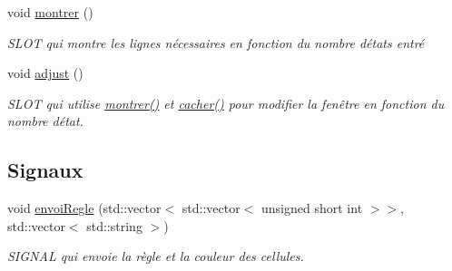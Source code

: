 \begin{DoxyCompactItemize}
void \hyperlink{class_regle2_d_a95a59bb0ffbc2a4fd735a4695c95d72f}{montrer} ()
\begin{DoxyCompactList}\small\item\em S\+L\+OT qui montre les lignes nécessaires en fonction du nombre d\textquotesingle{}états entré \end{DoxyCompactList}\item 
void \hyperlink{class_regle2_d_ae82e185c4e126e9bee7fd2e91e29b2f0}{adjust} ()
\begin{DoxyCompactList}\small\item\em S\+L\+OT qui utilise \hyperlink{class_regle2_d_a95a59bb0ffbc2a4fd735a4695c95d72f}{montrer()} et \hyperlink{class_regle2_d_a832501bff71ae1739d7936caee265477}{cacher()} pour modifier la fenêtre en fonction du nombre d\textquotesingle{}état. \end{DoxyCompactList}\end{DoxyCompactItemize}
\subsection*{Signaux}
\begin{DoxyCompactItemize}
\item 
void \hyperlink{class_regle2_d_ae4d763e7e7dec6c1e339769ba7ec0c52}{envoi\+Regle} (std\+::vector$<$ std\+::vector$<$ unsigned short int $>$$>$, std\+::vector$<$ std\+::string $>$)
\begin{DoxyCompactList}\small\item\em S\+I\+G\+N\+AL qui envoie la règle et la couleur des cellules. \end{DoxyCompactList}\end{DoxyCompactItemize}
